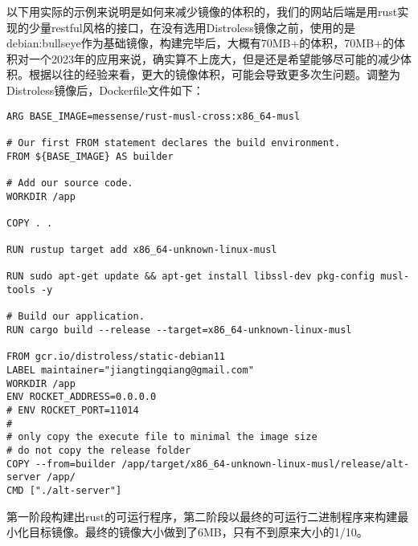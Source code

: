 \documentclass[../../../dolphin-book-2023.tex]{subfiles}
\begin{document}
以下用实际的示例来说明是如何来减少镜像的体积的，我们的网站后端是用rust实现的少量restful风格的接口，在没有选用Distroless镜像之前，使用的是debian:bullseye作为基础镜像，构建完毕后，大概有70MB+的体积，70MB+的体积对一个2023年的应用来说，确实算不上庞大，但是还是希望能够尽可能的减少体积。根据以往的经验来看，更大的镜像体积，可能会导致更多次生问题。调整为Distroless镜像后，Dockerfile文件如下：

\begin{lstlisting}
ARG BASE_IMAGE=messense/rust-musl-cross:x86_64-musl

# Our first FROM statement declares the build environment.
FROM ${BASE_IMAGE} AS builder

# Add our source code.
WORKDIR /app

COPY . .

RUN rustup target add x86_64-unknown-linux-musl

RUN sudo apt-get update && apt-get install libssl-dev pkg-config musl-tools -y

# Build our application.
RUN cargo build --release --target=x86_64-unknown-linux-musl

FROM gcr.io/distroless/static-debian11
LABEL maintainer="jiangtingqiang@gmail.com"
WORKDIR /app
ENV ROCKET_ADDRESS=0.0.0.0
# ENV ROCKET_PORT=11014
#
# only copy the execute file to minimal the image size
# do not copy the release folder
COPY --from=builder /app/target/x86_64-unknown-linux-musl/release/alt-server /app/
CMD ["./alt-server"]
\end{lstlisting}

第一阶段构建出rust的可运行程序，第二阶段以最终的可运行二进制程序来构建最小化目标镜像。最终的镜像大小做到了6MB，只有不到原来大小的1/10。
\end{document}
